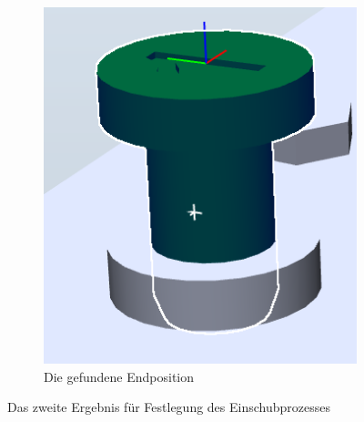 \documentclass[14pt,a4paper,titlepage]{article}
\begin{document}
\begin{figure}[h!]
\begin{subfigure}{0.3\linewidth}
				\includegraphics[width=\linewidth]{result4.png}
				\caption{Die gefundene Endposition}
			\end{subfigure}
			\caption{Das zweite Ergebnis für Festlegung des Einschubprozesses}
		\end{figure}
\end{document}

